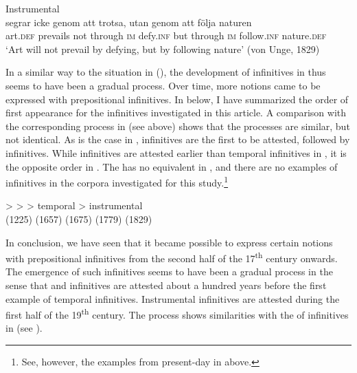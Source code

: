 \documentclass[output=paper]{langscibook}
\begin{document}
\ex Instrumental\label{ex:kalm:13b}\\
 segrar icke genom att trotsa, utan genom att följa naturen\\
art.\textsc{def} prevails not through \textsc{im} defy.\textsc{inf} but through \textsc{im} follow.\textsc{inf} nature.\textsc{def}\\
\glt ‘Art will not prevail by defying, but by following nature’ (von Unge, 1829)
\z 
\z 


In a similar way to the situation in  (\citealt{Schulte2007Prepositional,Schulte2007What}), the development of  infinitives in  thus seems to have been a gradual process. Over time, more  notions came to be expressed with prepositional infinitives. In  below, I have summarized the order of first appearance for the  infinitives investigated in this article. A comparison with the corresponding process in  (see  above) shows that the processes are similar, but not identical. As is the case in ,  infinitives are the first to be attested, followed by  infinitives. While  infinitives are attested earlier than temporal infinitives in , it is the opposite order in . The  has no equivalent in , and there are no examples of  infinitives in the  corpora investigated for this study.\footnote{See, however, the examples from present-day  in  above.}     

\ea  \label{ex:kalm:14}
\gll {} >    >  > temporal > instrumental\\
(1225) {} (1657) {} (1675) {} (1779) {} (1829)\\
\z 



In conclusion, we have seen that it became possible to express certain  notions with prepositional infinitives from the second half of the 17\textsuperscript{th} century onwards. The emergence of such  infinitives seems to have been a gradual process in the sense that  and  infinitives are attested about a hundred years before the first example of temporal infinitives. Instrumental infinitives are attested during the first half of the 19\textsuperscript{th} century. The process shows similarities with the  of  infinitives in  (see \citealt{Schulte2007Prepositional,Schulte2007What}). 
\end{document}
